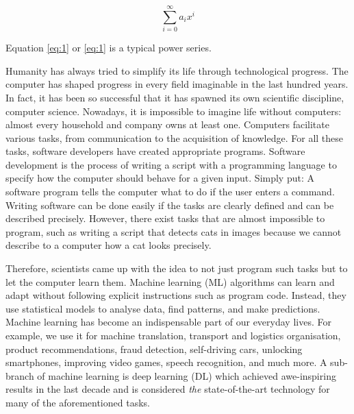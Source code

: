 \begin{equation}\label{eq:1}%
\sum_{i=0}^{\infty} a_i x^i
\end{equation}

Equation \ref{eq:1} or \eqref{eq:1} is a typical power series.

Humanity has always tried to simplify its life through technological progress.
The computer has shaped progress in every field imaginable in the last hundred years. 
In fact, it has been so successful that it has spawned its own scientific discipline, computer science.
Nowadays, it is impossible to imagine life without computers: almost every household and company owns at least one.
Computers facilitate various tasks, from communication to the acquisition of knowledge.
For all these tasks, software developers have created appropriate programs.
Software development is the process of writing a script with a programming language to specify how the computer should behave for a given input.
Simply put: A software program tells the computer what to do if the user enters a command.
Writing software can be done easily if the tasks are clearly defined and can be described precisely.
However, there exist tasks that are almost impossible to program, such as writing a script that detects cats in images because we cannot describe to a computer how a cat looks precisely.

Therefore, scientists came up with the idea to not just program such tasks but to let the computer learn them.
Machine learning (ML) algorithms can learn and adapt without following explicit instructions such as program code.
Instead, they use statistical models to analyse data, find patterns, and make predictions.
Machine learning has become an indispensable part of our everyday lives.
For example, we use it for machine translation, transport and logistics organisation, product recommendations, fraud detection, self-driving cars, unlocking smartphones, improving video games, speech recognition, and much more.
A sub-branch of machine learning is deep learning (DL) which achieved awe-inspiring results in the last decade and is considered \emph{the} state-of-the-art technology for many of the aforementioned tasks.

